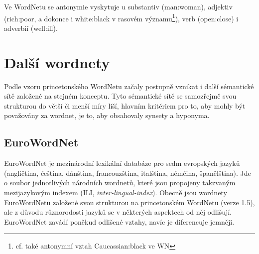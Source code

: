 \documentclass[a4paper, 11pt, oneside]{book}
\newcommand\ex{\textsf}
\begin{document}


					Ve WordNetu se antonymie vyskytuje u substantiv (\ex{man:woman}), adjektiv (\ex{rich:poor}, a dokonce i \ex{white:black} v rasovém významu\footnote{cf. také antonymní vztah \ex{Caucassian:black} ve WN}), verb (\ex{open:close}) i adverbií (\ex{well:ill}). \parencite{princetonWN}



		\chapter{Další wordnety}
		\label{cha:dalsi_wordnety}

		
			Podle vzoru princetonského WordNetu začaly postupně vznikat i další sémantické sítě založené na stejném konceptu. Tyto sémantické sítě se samozřejmě svou strukturou do větší či menší míry liší, hlavním kritériem pro to, aby mohly být považovány za wordnet, je to, aby obsahovaly synsety a hyponyma. \parencite{gwa2013wordnetsworld} %

			\section{EuroWordNet} %
			\label{sec:eurowordnet}
				

				EuroWordNet je mezinárodní lexikální databáze pro sedm evropských jazyků (angličtina, čeština, dánština, francouzština, italština, němčina, španělština). Jde o soubor jednotlivých národních wordnetů, které jsou propojeny takzvaným mezijazykovým indexem (ILI, \textit{inter-lingual-index}). Obecně jsou wordnety EuroWordNetu založené svou strukturou na princetonském WordNetu (verze 1.5), ale z důvodu různorodosti jazyků se v některých aspektech od něj odlišují. EuroWordNet zavádí poněkud odlišené vztahy, navíc je diferencuje jemněji. \parencite{pazienza2008bottom}
\end{document}
